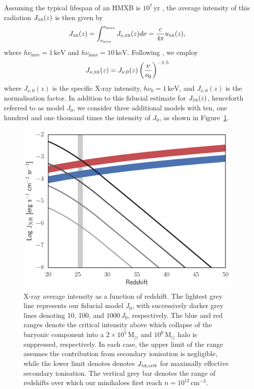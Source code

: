\documentclass{thesis}
\newcommand{\cc}{\ensuremath{\,\mathrm{cm}^{-3}}\xspace}
\newcommand{\msun}{\ensuremath{\,\mathrm{M}_{\odot}}\xspace}
\newcommand{\yr}{\ensuremath{\,\mathrm{yr}}\xspace}
\newcommand{\kev}{\ensuremath{\,\mathrm{keV}}\xspace}
\newcommand{\uxrz}{\ensuremath{{u}_{\textsc{xr}}(z)}\xspace}
\newcommand{\jxrz}{\ensuremath{J_{\textsc{xr}}(z)}\xspace}
\newcommand{\jxrvz}{\ensuremath{J_{\nu, \textsc{xr}}(z)}\xspace}
\newcommand{\jcrit}{\ensuremath{J_{\textsc{xr}, \mathrm{crit}}}\xspace}
\newcommand{\RefFig}[1]{\mbox{Figure~\ref{#1}}}
\begin{document}
Assuming the typical lifespan of an HMXB is $10^7\yr$ \citep[e.g.,][]{BelczynskiBulikFryer2012, Jeonetal2012}, the average
intensity of this radiation \jxrz is then given by 
\begin{equation} 
  \jxrz =  \int_{\nu_{\mathrm min}}^{\nu_{\mathrm max}} \jxrvz d\nu = \frac{c}{4\pi} \uxrz,
\end{equation}
where $h\nu_{\mathrm min} = 1\kev$ and $h\nu_{\mathrm max} = 10\kev$.
Following \citet{InayoshiOmukai2011}, we employ
\begin{equation}
  \label{JXRnu}
  \jxrvz = J_{\nu,0}(z) \left(\frac{\nu}{\nu_0}\right)^{-1.5} 
\end{equation}
where $J_{\nu,0}(z)$ is the specific X-ray intensity, $h\nu_0 = 1\kev$, and $J_{\nu, 0}(z)$ is the normalisation factor.
In addition to this fiducial estimate for \jxrz, henceforth referred to as model $J_0$, we consider three
additional models with ten, one hundred and one thousand times the
intensity of $J_0$, as shown in \RefFig{xrayIntensity}. 

\begin{figure}
 \begin{center}
   \includegraphics[width=\columnwidth]{figures/J_xr}
   \caption{X-ray average intensity as a function of redshift. The
     lightest grey line represents our fiducial model $J_0$, with successively darker grey lines denoting 10, 100, and $1000\,J_0$, respectively. The blue and red ranges denote the critical intensity above which collapse of the baryonic component into a $2\times10^5\msun$ and $10^6\msun$ halo is suppressed, respectively. In each case, the upper limit of the range assumes the contribution from secondary ionisation is negligible, while the lower limit denotes denotes \jcrit for maximally effective secondary ionisation. The vertical grey bar denotes the range of redshifts over which our minihaloes first reach $n=10^{12}\cc$.}
   \label{xrayIntensity}
 \end{center}
\end{figure}
\end{document}
